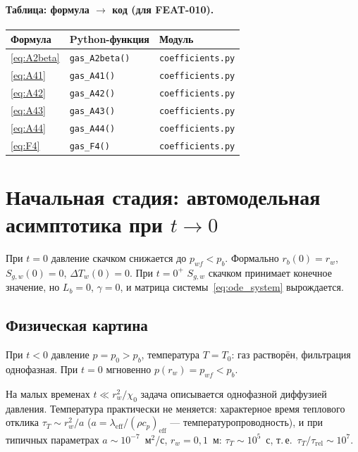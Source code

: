 \documentclass[12pt,a4paper]{article}
\newcommand{\eff}{\mathrm{eff}}
\begin{document}
\paragraph{Таблица: формула $\to$ код (для FEAT-010).}

\begin{center}
\small
\begin{tabular}{lll}
  \textbf{Формула} & \textbf{Python-функция} & \textbf{Модуль} \\
  \hline
  \eqref{eq:A2beta} & \texttt{gas\_A2beta()} & \texttt{coefficients.py} \\
  \eqref{eq:A41}    & \texttt{gas\_A41()}    & \texttt{coefficients.py} \\
  \eqref{eq:A42}    & \texttt{gas\_A42()}    & \texttt{coefficients.py} \\
  \eqref{eq:A43}    & \texttt{gas\_A43()}    & \texttt{coefficients.py} \\
  \eqref{eq:A44}    & \texttt{gas\_A44()}    & \texttt{coefficients.py} \\
  \eqref{eq:F4}     & \texttt{gas\_F4()}     & \texttt{coefficients.py} \\
\end{tabular}
\end{center}


\section{Начальная стадия: автомодельная асимптотика при $t \to 0$}
\label{sec:initial_stage}

При $t = 0$ давление скачком снижается до $p_{wf} < p_b$.
Формально $r_b(0) = r_w$, $S_{g,w}(0) = 0$, $\Delta T_w(0) = 0$.
При $t = 0^+$ $S_{g,w}$ скачком принимает конечное
значение, но $L_b = 0$, $\gamma = 0$, и матрица
системы~\eqref{eq:ode_system} вырождается.

\subsection{Физическая картина}

При $t < 0$ давление $p = p_0 > p_b$, температура $T = T_0$:
газ растворён, фильтрация однофазная.
При $t = 0$ мгновенно $p(r_w) = p_{wf} < p_b$.

На малых временах $t \ll r_w^2/\chi_0$ задача описывается
однофазной диффузией давления. Температура практически
не меняется: характерное время теплового отклика
$\tau_T \sim r_w^2/a$ ($a = \lambda_\eff/(\rho c_p)_\eff$
--- температуропроводность), и при типичных параметрах
$a \sim 10^{-7}$~м$^2$/с, $r_w = 0{,}1$~м:
$\tau_T \sim 10^5$~с, т.\,е.\
$\tau_T/\tau_\mathrm{rel} \sim 10^7$.
\end{document}

